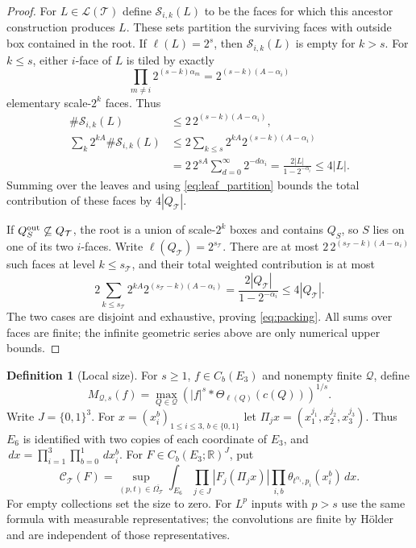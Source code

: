 \documentclass[12pt,reqno]{amsart}
\theoremstyle{plain}
\theoremstyle{definition}
\newtheorem{definition}[theorem]{Definition}
\theoremstyle{remark}
\numberwithin{equation}{section}
\newcommand{\R}{\mathbb R}
\newcommand{\T}{\mathcal T}
\newcommand{\dd}{\,d}
\begin{document}
\begin{proof}
For $L\in\mathcal L(\T)$ define $\mathscr S_{i,k}(L)$ to be the
faces for which this ancestor construction produces $L$. These sets
partition the surviving faces with outside box contained in the root.
If $\ell(L)=2^s$, then $\mathscr S_{i,k}(L)$ is empty for $k>s$.
For $k\le s$, either $i$-face of $L$ is tiled by exactly
\[
 \prod_{m\ne i}2^{(s-k)\alpha_m}
 =2^{(s-k)(A-\alpha_i)}
\]
elementary scale-$2^k$ faces. Thus
\begin{align*}
 \#\mathscr S_{i,k}(L)&\le2\,2^{(s-k)(A-\alpha_i)},\\
 \sum_k2^{kA}\#\mathscr S_{i,k}(L)
 &\le 2\sum_{k\le s}2^{kA}2^{(s-k)(A-\alpha_i)}\\
 &=2\,2^{sA}\sum_{d=0}^\infty2^{-d\alpha_i}
 =\frac{2|L|}{1-2^{-\alpha_i}}\le4|L|.
\end{align*}
Summing over the leaves and using \eqref{eq:leaf_partition} bounds
the total contribution of these faces by $4|Q_\T|$.

If $Q_S^{\rm out}\not\subseteq Q_\T$, the root is a union of
scale-$2^k$ boxes and contains $Q_S$, so $S$ lies on one of its
two $i$-faces. Write $\ell(Q_\T)=2^{s_\T}$. There are at most
$2\,2^{(s_\T-k)(A-\alpha_i)}$ such faces at level $k\le s_\T$,
and their total weighted contribution is at most
\[
 2\sum_{k\le s_\T}2^{kA}2^{(s_\T-k)(A-\alpha_i)}
 =\frac{2|Q_\T|}{1-2^{-\alpha_i}}\le4|Q_\T|.
\]
The two cases are disjoint and exhaustive, proving
\eqref{eq:packing}. All sums over faces are finite; the infinite
geometric series above are only numerical upper bounds.
\end{proof}

\begin{definition}[Local size]\label{def:size}
For $s\ge1$, $f\in C_b(E_3)$ and nonempty finite $\mathcal Q$, define
\[
 M_{\mathcal Q,s}(f)=\max_{Q\in\mathcal Q}
       (|f|^s*\Theta_{\ell(Q)}(c(Q)))^{1/s}.
\]
Write $J=\{0,1\}^3$. For $x=(x_i^b)_{1\le i\le3,\,b\in\{0,1\}}$
let $\Pi_j x=(x_1^{j_1},x_2^{j_2},x_3^{j_3})$.
Thus $E_6$ is identified with two copies of each coordinate of $E_3$,
and $\dd x=\prod_{i=1}^3\prod_{b=0}^1\dd x_i^b$.
For $F\in C_b(E_3;\R)^J$, put
\[
 \mathcal C_\T(F)=\sup_{(p,t)\in\overline{\Omega_\T}}
 \int_{E_6}\prod_{j\in J}|F_j(\Pi_j x)|
       \prod_{i,b}\theta_{t^{\alpha_i},p_i}(x_i^b)\dd x.
\]
For empty collections set the size to zero. For $L^p$ inputs with
$p>s$ use the same formula with measurable representatives; the
convolutions are finite by H\"older and are independent of those
representatives.
\end{definition}
\end{document}
